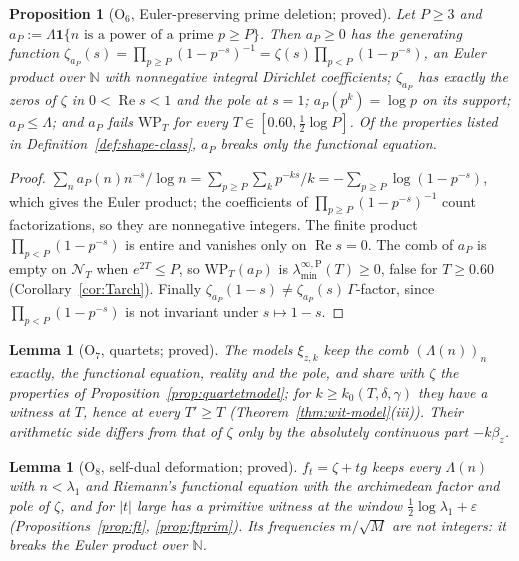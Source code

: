 \documentclass[11pt]{amsart}
\newtheorem{proposition}[theorem]{Proposition}
\newtheorem{lemma}[theorem]{Lemma}
\theoremstyle{definition}
\theoremstyle{remark}
\newcommand{\N}{\mathbb N}
\newcommand{\Rel}{\operatorname{Re}}
\newcommand{\NT}{\mathcal N_T}
\newcommand{\laminfP}{\lambda^{\infty,\mathrm P}_{\min}}
\begin{document}
\begin{proposition}[$\mathrm O_6$, Euler-preserving prime deletion; proved]\label{prop:shape-eulerdel}
Let $P\ge3$ and $a_P:=\Lambda\mathbf 1\{n\text{ is a power of a prime }p\ge P\}$. Then $a_P\ge0$ has the generating function
$\zeta_{a_P}(s)=\prod_{p\ge P}(1-p^{-s})^{-1}=\zeta(s)\prod_{p<P}(1-p^{-s})$, an Euler product over $\N$ with nonnegative integral
Dirichlet coefficients; $\zeta_{a_P}$ has exactly the zeros of $\zeta$ in $0<\Rel s<1$ and the pole at $s=1$; $a_P(p^k)=\log p$ on its
support; $a_P\le\Lambda$; and $a_P$ fails $\mathrm{WP}_T$ for every $T\in[0.60,\frac12\log P]$. Of the properties listed in
Definition~\ref{def:shape-class}, $a_P$ breaks only the functional equation.
\end{proposition}
\begin{proof}
$\sum_na_P(n)n^{-s}/\log n=\sum_{p\ge P}\sum_k p^{-ks}/k=-\sum_{p\ge P}\log(1-p^{-s})$, which gives the Euler product; the coefficients of
$\prod_{p\ge P}(1-p^{-s})^{-1}$ count factorizations, so they are nonnegative integers. The finite product $\prod_{p<P}(1-p^{-s})$ is
entire and vanishes only on $\Rel s=0$. The comb of $a_P$ is empty on $\NT$ when $e^{2T}\le P$, so $\mathrm{WP}_T(a_P)$ is
$\laminfP(T)\ge0$, false for $T\ge0.60$ (Corollary~\ref{cor:Tarch}). Finally $\zeta_{a_P}(1-s)\ne\zeta_{a_P}(s)\,\Gamma$-factor, since
$\prod_{p<P}(1-p^{-s})$ is not invariant under $s\mapsto1-s$.
\end{proof}

\begin{lemma}[$\mathrm O_7$, quartets; proved]\label{lem:shape-quartet}
The models $\xi_{z,k}$ keep the comb $(\Lambda(n))_n$ exactly, the functional equation, reality and the pole, and share with $\zeta$ the
properties of Proposition~\ref{prop:quartetmodel}; for $k\ge k_0(T,\delta,\gamma)$ they have a witness at $T$, hence at every $T'\ge T$
(Theorem~\ref{thm:wit-model}(iii)). Their arithmetic side differs from that of $\zeta$ only by the absolutely continuous part $-k\beta_z$.
\end{lemma}

\begin{lemma}[$\mathrm O_8$, self-dual deformation; proved]\label{lem:shape-ft}
$f_t=\zeta+tg$ keeps every $\Lambda(n)$ with $n<\lambda_1$ and Riemann's functional equation with the archimedean factor and pole of
$\zeta$, and for $|t|$ large has a primitive witness at the window $\frac12\log\lambda_1+\varepsilon$ (Propositions~\ref{prop:ft},
\ref{prop:ftprim}). Its frequencies $m/\sqrt M$ are not integers: it breaks the Euler product over $\N$.
\end{lemma}
\end{document}
